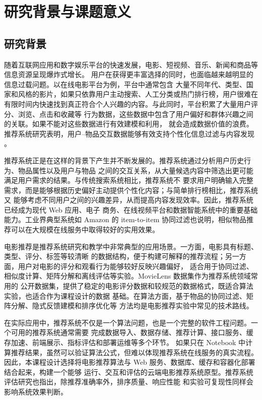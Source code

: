 \section{研究背景与课题意义}

\subsection{研究背景}

随着互联网应用和数字娱乐平台的快速发展，电影、短视频、音乐、新闻和商品等信息资源呈现爆炸式增长。
用户在获得更丰富选择的同时，也面临越来越明显的信息过载问题。以在线电影平台为例，平台中通常包含
大量不同年代、类型、国家和风格的影片，如果只依靠用户主动搜索、人工分类或热门排行榜，用户很难在
有限时间内快速找到真正符合个人兴趣的内容。与此同时，平台积累了大量用户评分、浏览、点击和收藏等
行为数据，这些数据中包含了用户偏好和群体兴趣之间的关联。如果不能对这些数据进行有效建模和利用，
就会造成数据价值的浪费。推荐系统研究表明，用户--物品交互数据能够有效支持个性化信息过滤与内容发现
\cite{adomavicius2005toward}。

推荐系统正是在这样的背景下产生并不断发展的。推荐系统通过分析用户历史行为、物品属性以及用户与物品
之间的交互关系，从大量候选内容中筛选出更可能满足用户需求的结果。与传统搜索系统相比，推荐系统不
要求用户明确输入完整需求，而是能够根据历史偏好主动提供个性化内容；与简单排行榜相比，推荐系统又
能够考虑不同用户之间的兴趣差异，从而提高内容发现效率。因此，推荐系统已经成为现代 Web 应用、电子
商务、在线视频平台和数据智能系统中的重要基础能力。工业界典型系统如 Amazon 的 item-to-item
协同过滤也说明，相似物品推荐可以在大规模在线服务中取得较好的实用效果\cite{linden2003amazon}。

电影推荐是推荐系统研究和教学中非常典型的应用场景。一方面，电影具有标题、类型、评分、标签等较清晰
的数据结构，便于构建可解释的推荐流程；另一方面，用户对电影的评分和观看行为能够较好反映兴趣偏好，
适合用于协同过滤、相似度计算、矩阵分解和离线评估等实验。MovieLens 数据集作为推荐系统领域常用的
公开数据集，提供了稳定的电影评分数据和较规范的数据格式，既适合算法实验，也适合作为课程设计的数据
基础\cite{harper2015movielens}。在算法方面，基于物品的协同过滤、矩阵分解、隐式反馈建模和排序优化等
方法均是电影推荐实验中常见的技术路线\cite{sarwar2001item,koren2009matrix,hu2008collaborative,rendle2009bpr}。

在实际应用中，推荐系统不仅是一个算法问题，也是一个完整的软件工程问题。一个可用的推荐系统通常需要
完成数据导入、数据存储、推荐计算、接口服务、缓存加速、前端展示、指标评估和部署运维等多个环节。
如果只在 Notebook 中计算推荐结果，虽然可以验证算法公式，但难以体现推荐系统在线服务的真实流程。
因此，本课程设计选择将电影推荐算法与 Web 服务、数据库、缓存和容器化部署结合起来，构建一个能够
运行、交互和评估的云端电影推荐系统原型。推荐系统评估研究也指出，除推荐准确率外，排序质量、响应性能
和实验可复现性同样会影响系统效果判断\cite{herlocker2004evaluating}。

